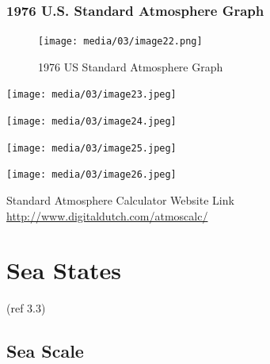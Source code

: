 \documentclass[
]{book}
\begin{document}
\hypertarget{u.s.-standard-atmosphere-graph}{%
\subsubsection*{1976 U.S. Standard Atmosphere Graph}\label{u.s.-standard-atmosphere-graph}}

\begin{figure}
\centering
\texttt{[image: media/03/image22.png]}
\caption{1976 US Standard Atmosphere Graph}
\end{figure}

\texttt{[image: media/03/image23.jpeg]}

\texttt{[image: media/03/image24.jpeg]}

\texttt{[image: media/03/image25.jpeg]}

\texttt{[image: media/03/image26.jpeg]}

Standard Atmosphere Calculator Website Link \url{http://www.digitaldutch.com/atmoscalc/}

\hypertarget{sea-states}{%
\section{Sea States}\label{sea-states}}

(ref 3.3)

\hypertarget{sea-scale}{%
\subsection*{Sea Scale}\label{sea-scale}}
\end{document}
